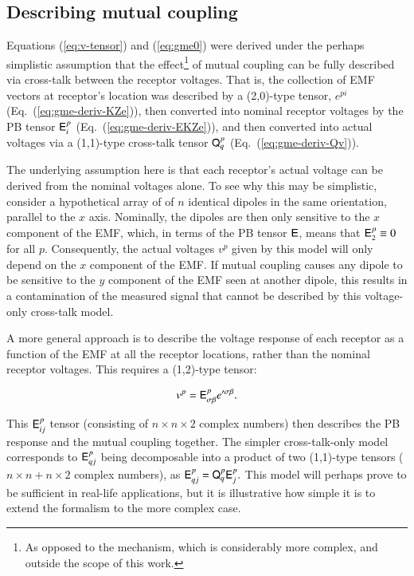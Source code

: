 \documentclass[]{aa}
\newcommand{\EDIT}[1]{#1}
\begin{document}
\subsection{Describing mutual coupling}

Equations (\ref{eq:v-tensor}) and (\ref{eq:gme0}) were derived under the perhaps simplistic assumption that the effect\footnote{As opposed
to the mechanism, which is considerably more complex, and outside the scope of this work.} of mutual coupling can be fully described via cross-talk between the receptor voltages. That is, the collection of EMF vectors at receptor's location was described by a (2,0)-type tensor, $e^{pi}$ (Eq.~(\ref{eq:gme-deriv-KZe})), then converted into nominal receptor voltages by the PB tensor $\mathsf{E}^p_i$ (Eq.~(\ref{eq:gme-deriv-EKZe})), and then converted into actual voltages via a (1,1)-type cross-talk tensor $\mathsf{Q}^p_q$ (Eq.~(\ref{eq:gme-deriv-Qv})).

The underlying assumption here is that each receptor's actual voltage can be derived from the nominal voltages alone. To see why this may
be simplistic, consider a hypothetical array of of $n$ identical dipoles in the same orientation, parallel to the
$x$ axis. Nominally, the dipoles are then only sensitive to the $x$ component of the EMF, which, in terms of the PB tensor $\mathsf{E}$, means that
$\mathsf{E}_{2}^{p}\equiv0$ for all $p$. Consequently, the actual voltages $v^{p}$ given by this model will only depend on the $x$ component of the EMF. \EDIT{If mutual coupling causes any dipole to be sensitive to the $y$ component of the EMF seen at another dipole, this results in a contamination of the measured signal that cannot be described by this voltage-only cross-talk model.}

A more general approach is to describe the voltage response of each receptor as a function of the EMF at all the receptor locations, rather than the
nominal receptor voltages. This requires a (1,2)-type tensor:

\[
v^{p}=\mathsf{E}_{\sigma\beta}^{p}e'^{\sigma\beta}.
\label{eq:v-tensor-gen}
\]

This $\mathsf{E}^p_{ij}$ tensor (consisting of $n\times n \times 2$ complex numbers) then describes the PB response and the mutual 
coupling together. The simpler cross-talk-only model corresponds to $\mathsf{E}^p_{qj}$ being decomposable into a product of two
(1,1)-type tensors ($n\times n+ n\times2$ complex numbers), as $\mathsf{E}_{qj}^{p}=\mathsf{Q}_q^p \mathsf{E}_j^p.$ This model will perhaps prove to be sufficient in real-life applications, but it is illustrative how simple it is to extend the formalism to the more complex case.
\end{document}
